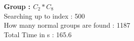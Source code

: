 \textbf{Group : $C_2*C_8$}\\
Searching up to index : 500\\
How many normal groups are found : 1187\\
Total Time in s : 165.6\\
